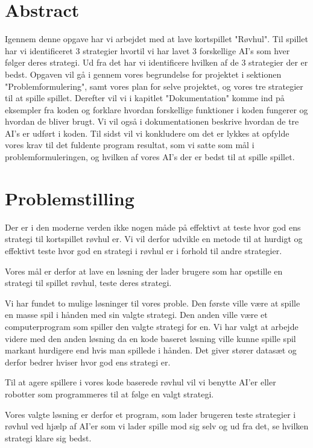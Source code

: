 \documentclass[a4paper, 12pt]{article}
\begin{document}
\section{Abstract}

Igennem denne opgave har vi arbejdet med at lave kortspillet "Røvhul". Til spillet har vi identificeret 3 strategier hvortil vi har lavet 3 forskellige AI’s som hver følger deres strategi. Ud fra det har vi identificere hvilken af de 3 strategier der er bedst. Opgaven vil gå i gennem vores begrundelse for projektet i sektionen "Problemformulering", samt vores plan for selve projektet, og vores tre strategier til at spille spillet.
\bigbreak
Derefter vil vi i kapitlet "Dokumentation" komme ind på eksempler fra koden og forklare hvordan forskellige funktioner i koden fungerer og hvordan de bliver brugt. Vi vil også i dokumentationen beskrive hvordan de tre AI's er udført i koden. 
\bigbreak
Til sidst vil vi konkludere om det er lykkes at opfylde vores krav til det fuldente program resultat, som vi satte som mål i problemformuleringen, og hvilken af vores AI's der er bedst til at spille spillet.

\section{Problemstilling}

Der er i den moderne verden ikke nogen måde på effektivt at teste hvor god ens strategi til kortspillet røvhul er. Vi vil derfor udvikle en metode til at hurdigt og effektivt teste hvor god en strategi i røvhul er i forhold til andre strategier.

Vores mål er derfor at lave en løsning der lader brugere som har opstille en strategi til spillet røvhul, teste deres strategi.



Vi har fundet to mulige løsninger til vores proble. Den første ville være at spille en masse spil i hånden med sin valgte strategi. Den anden ville være et computerprogram som spiller den valgte strategi for en. Vi har valgt at arbejde videre med den anden løsning da en kode baseret løsning ville kunne spille spil markant hurdigere end hvis man spillede i hånden. Det giver stører datasæt og derfor bedrer hviser hvor god ens strategi er.

Til at agere spillere i vores kode baserede røvhul vil vi benytte AI'er eller robotter som programmeres til at følge en valgt strategi.

Vores valgte løsning er derfor et program, som lader brugeren teste strategier i røvhul ved hjælp af AI'er som vi lader spille mod sig selv og ud fra det, se hvilken strategi klare sig bedst.
\end{document}
